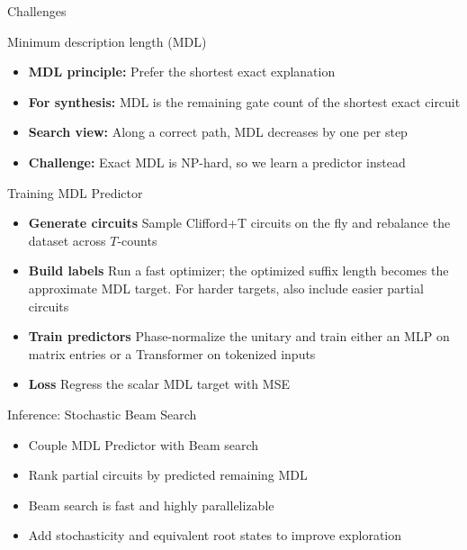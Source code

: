 \documentclass[final]{beamer}
\begin{document}
\begin{frame}[t]
\begin{columns}[t]
\begin{column}{\colwidth}
\begin{block}{Challenges}
  \end{block}

  \begin{posterfeatureblock}{Minimum description length (MDL)}
	  	\begin{itemize}
	  		\item \textbf{MDL principle:} Prefer the shortest exact explanation
			\item \textbf{For synthesis:} MDL is the remaining gate count of the shortest exact circuit
			\item \textbf{Search view:} Along a correct path, MDL decreases by one per step
			\item \textbf{Challenge:} Exact MDL is NP-hard, so we learn a predictor instead
	  	\end{itemize}
	   
  \end{posterfeatureblock}
  
  \begin{block}{Training MDL Predictor}
	  	\begin{itemize}
	  		\item \textbf{Generate circuits} Sample Clifford+T circuits on the fly and rebalance the dataset across $T$-counts
	  		\item \textbf{Build labels} Run a fast optimizer; the optimized suffix length becomes the approximate MDL target. For harder targets, also include easier partial circuits
	  		\item \textbf{Train predictors} Phase-normalize the unitary and train either an MLP on matrix entries or a Transformer on tokenized inputs
	  		\item \textbf{Loss} Regress the scalar MDL target with MSE
	  	\end{itemize}
  \end{block}
  
  \begin{block}{Inference: Stochastic Beam Search}
  	\begin{itemize}
  		\item Couple MDL Predictor with Beam search
  		\item Rank partial circuits by predicted remaining MDL
  		\item Beam search is fast and highly parallelizable
  		\item Add stochasticity and equivalent root states to improve exploration
  	\end{itemize}
 \end{block}	
  

\end{column}
\end{columns}
\end{frame}
\end{document}
